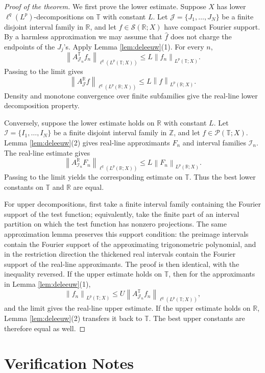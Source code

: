 \documentclass[11pt]{article}
\newcommand{\T}{\mathbb T}
\newcommand{\R}{\mathbb R}
\newcommand{\Z}{\mathbb Z}
\newcommand{\cP}{\mathcal P}
\newcommand{\cS}{\mathcal S}
\newcommand{\norm}[1]{\left\lVert #1 \right\rVert}
\begin{document}
\begin{proof}[Proof of the theorem]
We first prove the lower estimate.  Suppose \(X\) has lower
\(\ell^q(L^p)\)-decompositions on \(\T\) with constant \(L\).  Let
\(\mathcal J=\{J_1,\ldots,J_N\}\) be a finite disjoint interval family in
\(\R\), and let \(f\in\cS(\R;X)\) have compact Fourier support.  By a harmless
approximation we may assume that \(\widehat f\) does not charge the endpoints
of the \(J_j\)'s.  Apply Lemma \ref{lem:deleeuw}(1).  For every \(n\),
\[
  \norm{A_{\mathcal J_n}^\T f_n}_{\ell^q(L^p(\T;X))}
  \le L\norm{f_n}_{L^p(\T;X)}.
\]
Passing to the limit gives
\[
  \norm{A_{\mathcal J}^\R f}_{\ell^q(L^p(\R;X))}
  \le L\norm{f}_{L^p(\R;X)}.
\]
Density and monotone convergence over finite subfamilies give the real-line
lower decomposition property.

Conversely, suppose the lower estimate holds on \(\R\) with constant \(L\).
Let \(\mathcal I=\{I_1,\ldots,I_N\}\) be a finite disjoint interval family in
\(\Z\), and let \(f\in\cP(\T;X)\).  Lemma \ref{lem:deleeuw}(2) gives
real-line approximants \(F_n\) and interval families \(\mathcal I_n\).  The
real-line estimate gives
\[
  \norm{A_{\mathcal I_n}^\R F_n}_{\ell^q(L^p(\R;X))}
  \le L\norm{F_n}_{L^p(\R;X)}.
\]
Passing to the limit yields the corresponding estimate on \(\T\).  Thus the
best lower constants on \(\T\) and \(\R\) are equal.

For upper decompositions, first take a finite interval family containing the
Fourier support of the test function; equivalently, take the finite part of an
interval partition on which the test function has nonzero projections.  The
same approximation lemma preserves this support condition: the preimage
intervals contain the Fourier support of the approximating trigonometric
polynomial, and in the restriction direction the thickened real intervals
contain the Fourier support of the real-line approximants.  The proof is then
identical, with the inequality reversed.  If the upper estimate holds on
\(\T\), then for the approximants in Lemma \ref{lem:deleeuw}(1),
\[
  \norm{f_n}_{L^p(\T;X)}
  \le U\norm{A_{\mathcal J_n}^\T f_n}_{\ell^q(L^p(\T;X))},
\]
and the limit gives the real-line upper estimate.  If the upper estimate
holds on \(\R\), Lemma \ref{lem:deleeuw}(2) transfers it back to \(\T\).  The
best upper constants are therefore equal as well.
\end{proof}

\section*{Verification Notes}
\end{document}
